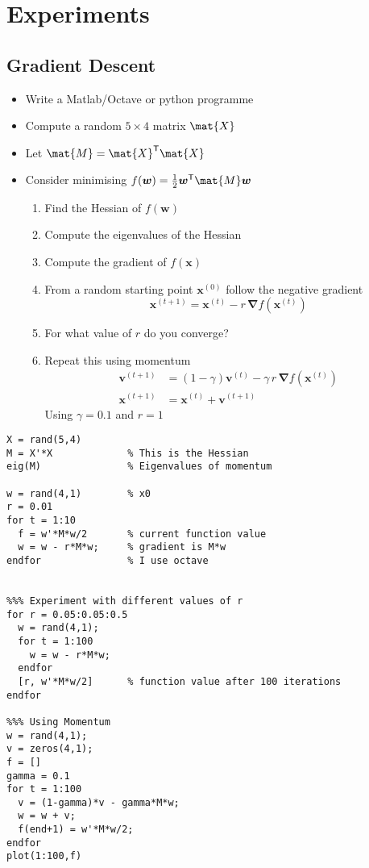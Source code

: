 \documentclass[11pt]{article}
\newcommand{\tr}{\textsf{T}}
\newcommand{\grad}{\bm{\nabla}}
\begin{document}
\section{Experiments}
\label{sec:orgdc9310e}

\subsection{Gradient Descent}
\label{sec:org69e46d2}
\begin{itemize}
\item Write a Matlab/Octave or python programme
\item Compute a random \(5\times4\) matrix \(\mat{X}\)
\item Let \(\mat{M} = \mat{X}^\tr\mat{X}\)
\item Consider minimising \(f(\bm{w}) = \frac{1}{2} \bm{w}^\tr \mat{M} \bm{w}\)
\begin{enumerate}
\item Find the Hessian of \(f(\bm{w})\)
\item Compute the eigenvalues of the Hessian
\item Compute the gradient of \(f(\bm{x})\)
\item From a random starting point \(\bm{x}^{(0)}\) follow the negative gradient
$$ \bm{x}^{(t+1)} = \bm{x}^{(t)} - r\,\grad f(\bm{x}^{(t)}) $$
\item For what value of \(r\) do you converge?
\item Repeat this using momentum
\begin{align*}
\bm{v}^{(t+1)} &= (1-\gamma) \bm{v}^{(t)} -\gamma\, r\,\grad f(\bm{x}^{(t)}) \\
\bm{x}^{(t+1)} &= \bm{x}^{(t)} + \bm{v}^{(t+1)}
\end{align*}
Using \(\gamma=0.1\) and \(r=1\)
\end{enumerate}
\end{itemize}

\begin{verbatim}
X = rand(5,4)
M = X'*X             % This is the Hessian
eig(M)               % Eigenvalues of momentum

w = rand(4,1)        % x0
r = 0.01
for t = 1:10
  f = w'*M*w/2       % current function value
  w = w - r*M*w;     % gradient is M*w
endfor               % I use octave


%%% Experiment with different values of r
for r = 0.05:0.05:0.5
  w = rand(4,1);
  for t = 1:100
    w = w - r*M*w;
  endfor
  [r, w'*M*w/2]      % function value after 100 iterations
endfor

%%% Using Momentum
w = rand(4,1);
v = zeros(4,1);
f = []
gamma = 0.1
for t = 1:100
  v = (1-gamma)*v - gamma*M*w;
  w = w + v;
  f(end+1) = w'*M*w/2;
endfor
plot(1:100,f)
\end{verbatim}
\end{document}
